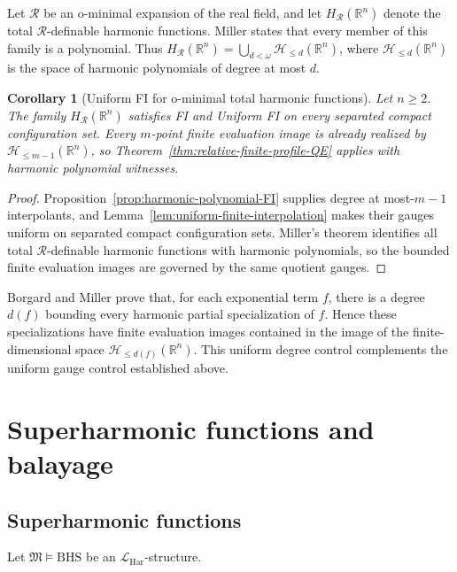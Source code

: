 \documentclass{amsart}
\newtheorem{corollary}[theorem]{Corollary}
\theoremstyle{definition}
\theoremstyle{remark}
\numberwithin{equation}{section}
\begin{document}
Let $\mathcal R$ be an o-minimal expansion of the real field, and let $H_{\mathcal R}(\mathbb R^n)$ denote the total $\mathcal R$-definable harmonic functions. Miller \cite{Miller2026blms} states that every member of this family is a polynomial. Thus $H_{\mathcal R}(\mathbb R^n)=\bigcup_{d<\omega}\mathscr H_{\le d}(\mathbb R^n)$, where $\mathscr H_{\le d}(\mathbb R^n)$ is the space of harmonic polynomials of degree at most $d$.

\begin{corollary}[Uniform FI for o-minimal total harmonic functions]
	\label{cor:FI-o-minimal-total-harmonic}
	Let $n\ge2$. The family $H_{\mathcal R}(\mathbb R^n)$ satisfies FI and Uniform FI on every separated compact configuration set. Every $m$-point finite evaluation image is already realized by $\mathscr H_{\le m-1}(\mathbb R^n)$, so Theorem~\ref{thm:relative-finite-profile-QE} applies with harmonic polynomial witnesses.
\end{corollary}

\begin{proof}
	Proposition~\ref{prop:harmonic-polynomial-FI} supplies degree at most-$m-1$ interpolants, and Lemma~\ref{lem:uniform-finite-interpolation} makes their gauges uniform on separated compact configuration sets. Miller's theorem identifies all total $\mathcal R$-definable harmonic functions with harmonic polynomials, so the bounded finite evaluation images are governed by the same quotient gauges.
\end{proof}

Borgard and Miller \cite{Borgard_Miller_2026} prove that, for each exponential term $f$, there is a degree $d(f)$ bounding every harmonic partial specialization of $f$. Hence these specializations have finite evaluation images contained in the image of the finite-dimensional space $\mathscr H_{\le d(f)}(\mathbb R^n)$. This uniform degree control complements the uniform gauge control established above.




\section{Superharmonic functions and balayage}

\subsection{Superharmonic functions}
Let $\mathfrak M\models\mathrm{BHS}$ be an $\mathcal L_{\mathrm{Har}}$-structure.
\end{document}
